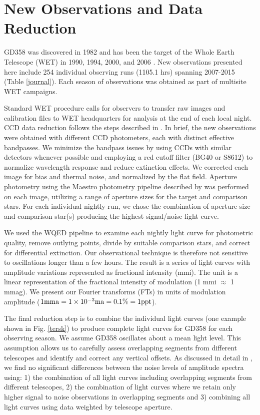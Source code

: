 \documentclass[12pt,preprint]{aastex}
\begin{document}
\section {New Observations and Data Reduction}\label{data}

GD358 was discovered in 1982 \citep{Winget82} and has been the target of the Whole 
Earth Telescope (WET) in 1990, 1994, 2000, and 2006 \citep{Provencal09, Kepler03,Winget94}. 
New observations presented here include 254 individual observing runs (1105.1 hrs) spanning 
2007-2015 (Table \ref{journal}). Each season of observations was obtained as part of 
multisite WET campaigns. 

Standard WET procedure calls for observers to transfer raw images and 
calibration files to WET headquarters for analysis at the end of each local night. CCD 
data reduction follows the steps described in \citet{Provencal12}. In brief, the new observations 
were obtained with different CCD photometers, each with distinct effective bandpasses. 
We minimize the bandpass issues by using CCDs with similar detectors whenever possible and 
employing a red cutoff filter (BG40 or S8612) to normalize wavelength response and 
reduce extinction effects. We corrected each image for bias and thermal noise, and 
normalized by the flat field. Aperture photometry using the Maestro photometry pipeline 
described by \citet{Dalessio10} was performed on each image, utilizing a range of 
aperture sizes for the target and comparison stars. For each individual nightly run, we 
chose the combination of aperture size and comparison star(s) producing the highest 
signal/noise light curve. 

We used the WQED pipeline \citep{wqed} to examine each nightly light curve for photometric 
quality, remove outlying points, divide by suitable comparison stars, and correct for 
differential extinction. Our observational technique is therefore not sensitive to 
oscillations longer than a few hours. The result is a series of light curves 
with amplitude variations represented as fractional intensity (mmi). The unit is a linear 
representation of the fractional intensity of modulation (1 mmi $\approx$ 1 mmag). We present
our Fourier transforms (FTs) in units of modulation amplitude 
($1 {\rm mma}=1 \times 10^{-3} {\rm ma} = 0.1 \% = 1 {\rm ppt}$).

The final reduction step is to combine the individual light curves (one example shown in Fig. \ref{tersk}) to produce 
complete light curves for GD358 for each observing season. We assume GD358 oscillates about 
a mean light level. This assumption allows us to carefully assess overlapping segments from 
different telescopes and identify and correct any vertical offsets. As discussed in detail 
in \citet{Provencal09}, we find no significant differences between the noise levels of 
amplitude spectra using: 1) the combination of all light curves including overlapping 
segments from different telescopes, 2) the combination of light curves where we retain 
only higher signal to noise observations in overlapping segments and 3) combining all light 
curves using data weighted by telescope aperture.
\end{document}
